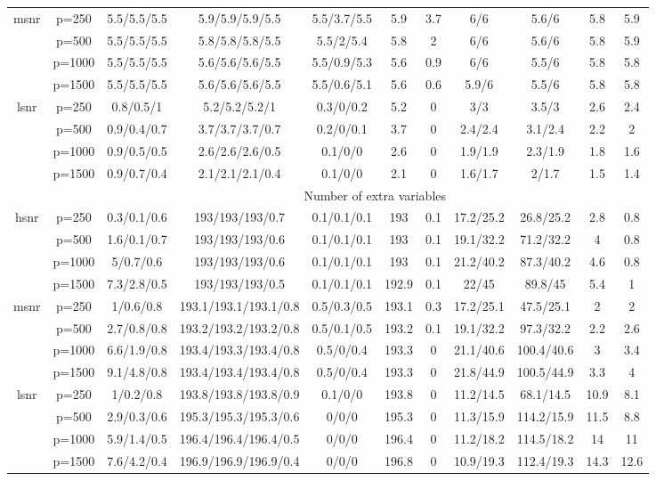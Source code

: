 \begin{table}[ht]
{\begin{tabular}{|c|c|ccccccccc|}
  \midrule\multirow{4}[2]{*}{msnr} & p=250 & 5.5/5.5/5.5 & 5.9/5.9/5.9/5.5 & 5.5/3.7/5.5 & 5.9 & 3.7 & 6/6 & 5.6/6 & 5.8 & 5.9 \\ 
   & p=500 & 5.5/5.5/5.5 & 5.8/5.8/5.8/5.5 & 5.5/2/5.4 & 5.8 & 2 & 6/6 & 5.6/6 & 5.8 & 5.9 \\ 
   & p=1000 & 5.5/5.5/5.5 & 5.6/5.6/5.6/5.5 & 5.5/0.9/5.3 & 5.6 & 0.9 & 6/6 & 5.5/6 & 5.8 & 5.8 \\ 
   & p=1500 & 5.5/5.5/5.5 & 5.6/5.6/5.6/5.5 & 5.5/0.6/5.1 & 5.6 & 0.6 & 5.9/6 & 5.5/6 & 5.8 & 5.8 \\ 
  \midrule\multirow{4}[2]{*}{lsnr} & p=250 & 0.8/0.5/1 & 5.2/5.2/5.2/1 & 0.3/0/0.2 & 5.2 & 0 & 3/3 & 3.5/3 & 2.6 & 2.4 \\ 
   & p=500 & 0.9/0.4/0.7 & 3.7/3.7/3.7/0.7 & 0.2/0/0.1 & 3.7 & 0 & 2.4/2.4 & 3.1/2.4 & 2.2 & 2 \\ 
   & p=1000 & 0.9/0.5/0.5 & 2.6/2.6/2.6/0.5 & 0.1/0/0 & 2.6 & 0 & 1.9/1.9 & 2.3/1.9 & 1.8 & 1.6 \\ 
   & p=1500 & 0.9/0.7/0.4 & 2.1/2.1/2.1/0.4 & 0.1/0/0 & 2.1 & 0 & 1.6/1.7 & 2/1.7 & 1.5 & 1.4 \\ 
   \midrule 
 \multicolumn{1}{|c}{} &       & \multicolumn{9}{c|}{Number of extra variables} \\
\midrule\multirow{4}[2]{*}{hsnr} & p=250 & 0.3/0.1/0.6 & 193/193/193/0.7 & 0.1/0.1/0.1 & 193 & 0.1 & 17.2/25.2 & 26.8/25.2 & 2.8 & 0.8 \\ 
   & p=500 & 1.6/0.1/0.7 & 193/193/193/0.6 & 0.1/0.1/0.1 & 193 & 0.1 & 19.1/32.2 & 71.2/32.2 & 4 & 0.8 \\ 
   & p=1000 & 5/0.7/0.6 & 193/193/193/0.6 & 0.1/0.1/0.1 & 193 & 0.1 & 21.2/40.2 & 87.3/40.2 & 4.6 & 0.8 \\ 
   & p=1500 & 7.3/2.8/0.5 & 193/193/193/0.5 & 0.1/0.1/0.1 & 192.9 & 0.1 & 22/45 & 89.8/45 & 5.4 & 1 \\ 
  \midrule\multirow{4}[2]{*}{msnr} & p=250 & 1/0.6/0.8 & 193.1/193.1/193.1/0.8 & 0.5/0.3/0.5 & 193.1 & 0.3 & 17.2/25.1 & 47.5/25.1 & 2 & 2 \\ 
   & p=500 & 2.7/0.8/0.8 & 193.2/193.2/193.2/0.8 & 0.5/0.1/0.5 & 193.2 & 0.1 & 19.1/32.2 & 97.3/32.2 & 2.2 & 2.6 \\ 
   & p=1000 & 6.6/1.9/0.8 & 193.4/193.3/193.4/0.8 & 0.5/0/0.4 & 193.3 & 0 & 21.1/40.6 & 100.4/40.6 & 3 & 3.4 \\ 
   & p=1500 & 9.1/4.8/0.8 & 193.4/193.4/193.4/0.8 & 0.5/0/0.4 & 193.3 & 0 & 21.8/44.9 & 100.5/44.9 & 3.3 & 4 \\ 
  \midrule\multirow{4}[2]{*}{lsnr} & p=250 & 1/0.2/0.8 & 193.8/193.8/193.8/0.9 & 0.1/0/0 & 193.8 & 0 & 11.2/14.5 & 68.1/14.5 & 10.9 & 8.1 \\ 
   & p=500 & 2.9/0.3/0.6 & 195.3/195.3/195.3/0.6 & 0/0/0 & 195.3 & 0 & 11.3/15.9 & 114.2/15.9 & 11.5 & 8.8 \\ 
   & p=1000 & 5.9/1.4/0.5 & 196.4/196.4/196.4/0.5 & 0/0/0 & 196.4 & 0 & 11.2/18.2 & 114.5/18.2 & 14 & 11 \\ 
   & p=1500 & 7.6/4.2/0.4 & 196.9/196.9/196.9/0.4 & 0/0/0 & 196.8 & 0 & 10.9/19.3 & 112.4/19.3 & 14.3 & 12.6 \\ 
   \bottomrule 
\end{tabular}
}
\end{table}
